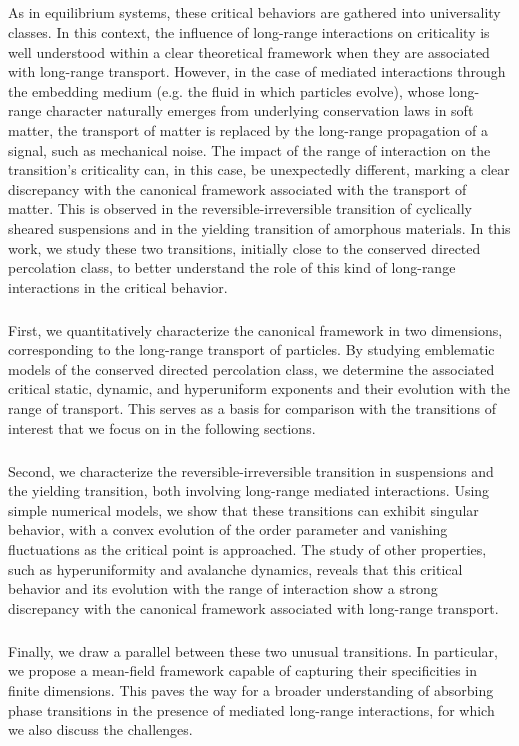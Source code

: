 \subparagraph{}As in equilibrium systems, these critical behaviors are gathered into universality classes. In this context, the influence of long-range interactions on criticality is well understood within a clear theoretical framework when they are associated with long-range transport. However, in the case of mediated interactions through the embedding medium (e.g. the fluid in which particles evolve), whose long-range character naturally emerges from underlying conservation laws in soft matter, the transport of matter is replaced by the long-range propagation of a signal, such as mechanical noise. The impact of the range of interaction on the transition's criticality can, in this case, be unexpectedly different, marking a clear discrepancy with the canonical framework associated with the transport of matter. This is observed in the reversible-irreversible transition of cyclically sheared suspensions and in the yielding transition of amorphous materials. In this work, we study these two transitions, initially close to the conserved directed percolation class, to better understand the role of this kind of long-range interactions in the critical behavior.

\subparagraph{}First, we quantitatively characterize the canonical framework in two dimensions, corresponding to the long-range transport of particles. By studying emblematic models of the conserved directed percolation class, we determine the associated critical static, dynamic, and hyperuniform exponents and their evolution with the range of transport. This serves as a basis for comparison with the transitions of interest that we focus on in the following sections.

\subparagraph{}Second, we characterize the reversible-irreversible transition in suspensions and the yielding transition, both involving long-range mediated interactions. Using simple numerical models, we show that these transitions can exhibit singular behavior, with a convex evolution of the order parameter and vanishing fluctuations as the critical point is approached. The study of other properties, such as hyperuniformity and avalanche dynamics, reveals that this critical behavior and its evolution with the range of interaction show a strong discrepancy with the canonical framework associated with long-range transport.

\subparagraph{}Finally, we draw a parallel between these two unusual transitions. In particular, we propose a mean-field framework capable of capturing their specificities in finite dimensions. This paves the way for a broader understanding of absorbing phase transitions in the presence of mediated long-range interactions, for which we also discuss the challenges.